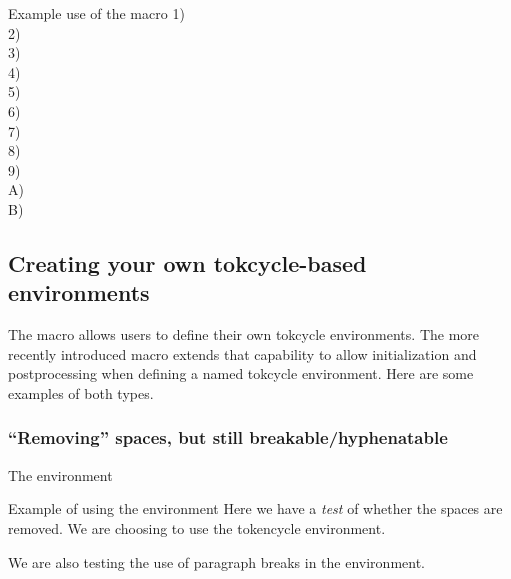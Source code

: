 \documentclass[10pt]{article}
\newcommand\TokCycle{\textsf{tokcycle}}
\begin{document}
\begin{exampleA}[lefthand width=8.0cm]{Example use of the 
  macro}
1) \\
2) \\
3) \\
4) \sigdigits{1.3\today}\\
5) \\
6) \\
7) \\
8) \\
9) \\
A) \\
B) 
\end{exampleA}

\endgroup


\subsection{Creating your own \TokCycle-based environments}

The  macro allows users to define
  their own \TokCycle{} environments.  
The more recently introduced  macro extends 
  that capability to allow initialization and postprocessing when defining
  a named \TokCycle{} environment.
Here are some examples of both types.

\subsubsection{``Removing'' spaces, but still breakable/hyphenatable}

\begingroup

\begin{exampleC}[]{The  environment}
\tokcycleenvironment\spaceBgone
    {}
    {}
    {}
    {\addcytoks{\hspace{.2pt plus .2pt minus .8pt}}}%
\end{exampleC}

\begin{exampleA}[lefthand width=6.0cm]{Example of using the 
  environment}
\spaceBgone
  Here we have a \textit{test} of 
  whether the spaces are removed.  
  We are choosing to use the 
  tokencycle environment.

  We are also testing the use of 
  paragraph breaks in the 
  environment.
\endspaceBgone
\end{exampleA}
\end{document}

